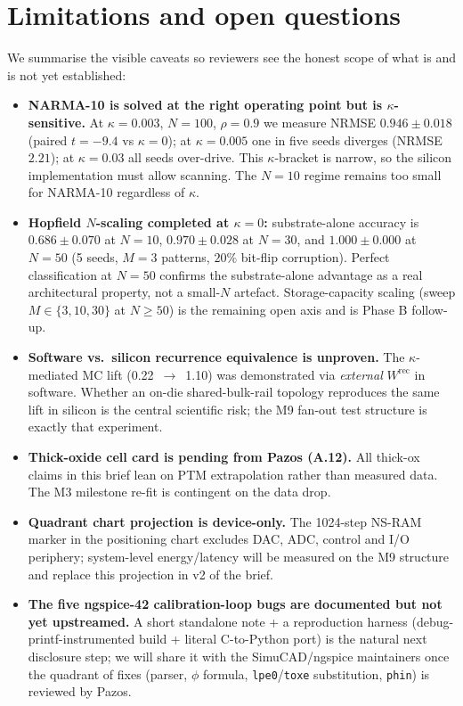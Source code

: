 \documentclass[fontsize=10pt]{article}
\begin{document}
\section{Limitations and open questions}
We summarise the visible caveats so reviewers see the honest scope of what is
and is not yet established:
\begin{itemize}\setlength{\itemsep}{1pt}
  \item \textbf{NARMA-10 is solved at the right operating point but is
    $\kappa$-sensitive.} At $\kappa=0.003$, $N=100$, $\rho=0.9$ we measure
    NRMSE $0.946 \pm 0.018$ (paired $t=-9.4$ vs $\kappa=0$); at $\kappa=0.005$
    one in five seeds diverges (NRMSE $2.21$); at $\kappa=0.03$ all seeds
    over-drive. This $\kappa$-bracket is narrow, so the silicon implementation
    must allow scanning. The $N=10$ regime remains too small for NARMA-10
    regardless of $\kappa$.
  \item \textbf{Hopfield $N$-scaling completed at $\kappa=0$:}
    substrate-alone accuracy is $0.686 \pm 0.070$ at $N=10$, $0.970 \pm 0.028$
    at $N=30$, and $\mathbf{1.000 \pm 0.000}$ at $N=50$ (5 seeds, $M=3$
    patterns, $20\%$ bit-flip corruption). Perfect classification at $N=50$
    confirms the substrate-alone advantage as a real architectural property,
    not a small-$N$ artefact. Storage-capacity scaling (sweep $M \in \{3,
    10, 30\}$ at $N{\geq}50$) is the remaining open axis and is Phase B
    follow-up.
  \item \textbf{Software vs.\ silicon recurrence equivalence is unproven.}
    The $\kappa$-mediated MC lift (0.22~$\to$~1.10) was demonstrated via
    \emph{external} $W^{\mathrm{rec}}$ in software. Whether an on-die
    shared-bulk-rail topology reproduces the same lift in silicon is the
    central scientific risk; the M9 fan-out test structure is exactly that
    experiment.
  \item \textbf{Thick-oxide cell card is pending from Pazos (A.12).}
    All thick-ox claims in this brief lean on PTM extrapolation rather than
    measured data. The M3 milestone re-fit is contingent on the data drop.
  \item \textbf{Quadrant chart projection is device-only.} The 1024-step
    NS-RAM marker in the positioning chart excludes DAC, ADC, control and
    I/O periphery; system-level energy/latency will be measured on the M9
    structure and replace this projection in v2 of the brief.
  \item \textbf{The five ngspice-42 calibration-loop bugs are documented but
    not yet upstreamed.} A short standalone note + a reproduction harness
    (debug-printf-instrumented build + literal C-to-Python port) is the
    natural next disclosure step; we will share it with the SimuCAD/ngspice
    maintainers once the quadrant of fixes (parser, $\phi$ formula,
    \texttt{lpe0}/\texttt{toxe} substitution, \texttt{phin}) is reviewed by
    Pazos.
\end{itemize}
\end{document}
